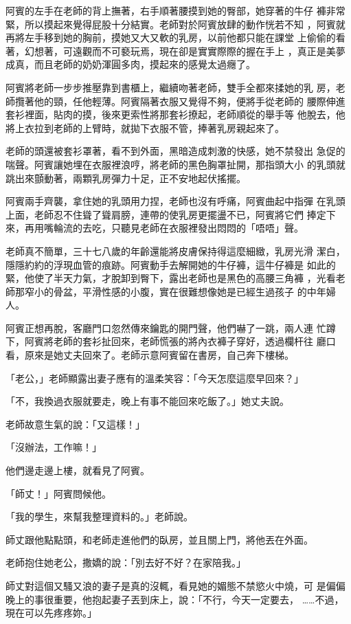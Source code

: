 阿賓的左手在老師的背上撫著，右手順著腰摸到她的臀部，她穿著的牛仔
褲非常緊，所以摸起來覺得屁股十分結實。老師對於阿賓放肆的動作恍若不知
，阿賓就再將左手移到她的胸前，摸她又大又軟的乳房，以前他都只能在課堂
上偷偷的看著，幻想著，可遠觀而不可褻玩焉，現在卻是實實際際的握在手上
，真正是美夢成真，而且老師的奶奶渾圓多肉，摸起來的感覺太過癮了。

阿賓將老師一步步推壓靠到書櫃上，繼續吻著老師，雙手全都來揉她的乳
房，老師攬著他的頸，任他輕薄。阿賓隔著衣服又覺得不夠，便將手從老師的
腰際伸進套衫裡面，貼肉的摸，後來更索性將那套衫撩起，老師順從的舉手等
他脫去，他將上衣拉到老師的上臂時，就拋下衣服不管，捧著乳房親起來了。

老師的頭還被套衫罩著，看不到外面，黑暗造成刺激的快感，她不禁發出
急促的喘聲。阿賓讓她埋在衣服裡浪哼，將老師的黑色胸罩扯開，那指頭大小
的乳頭就跳出來顫動著，兩顆乳房彈力十足，正不安地起伏搖擺。

阿賓兩手齊襲，拿住她的乳頭用力捏，老師也沒有呼痛，阿賓曲起中指彈
在乳頭上面，老師忍不住聳了聳肩膀，連帶的使乳房更擺盪不已，阿賓將它們
捧定下來，再用嘴輪流的去吃，只聽見老師在衣服裡發出悶悶的「唔唔」聲。

老師真不簡單，三十七八歲的年齡還能將皮膚保持得這麼細緻，乳房光滑
潔白，隱隱約約的浮現血管的痕跡。阿賓動手去解開她的牛仔褲，這牛仔褲是
如此的緊，他使了半天力氣，才脫卸到臀下，露出老師也是黑色的高腰三角褲
，光看老師那窄小的骨盆，平滑性感的小腹，實在很難想像她是已經生過孩子
的中年婦人。

阿賓正想再脫，客廳門口忽然傳來鑰匙的開門聲，他們嚇了一跳，兩人連
忙蹲下，阿賓將老師的套衫扯回來，老師慌張的將內衣褲子穿好，透過欄杆往
廳口看，原來是她丈夫回來了。老師示意阿賓留在書房，自己奔下樓梯。

「老公，」老師顯露出妻子應有的溫柔笑容：「今天怎麼這麼早回來？」

「不，我換過衣服就要走，晚上有事不能回來吃飯了。」她丈夫說。

老師故意生氣的說：「又這樣！」

「沒辦法，工作嘛！」

他們邊走邊上樓，就看見了阿賓。

「師丈！」阿賓問候他。

「我的學生，來幫我整理資料的。」老師說。

師丈跟他點點頭，和老師走進他們的臥房，並且關上門，將他丟在外面。

老師抱住她老公，撒嬌的說：「別去好不好？在家陪我。」

師丈對這個又騷又浪的妻子是真的沒輒，看見她的媚態不禁慾火中燒，可
是偏偏晚上的事很重要，他抱起妻子丟到床上，說：「不行，今天一定要去，
……不過，現在可以先疼疼妳。」

